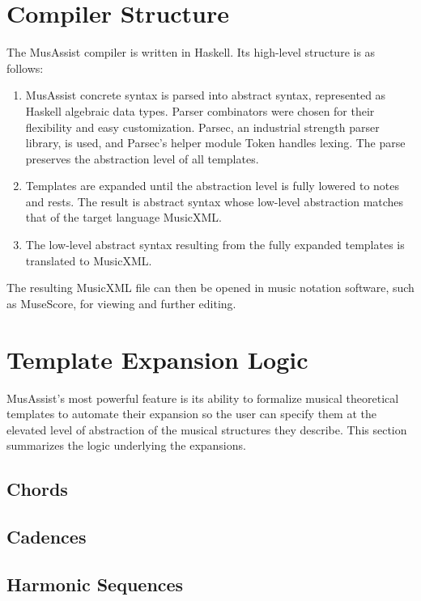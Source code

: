\documentclass{article}
\begin{document}
\section{Compiler Structure}

The MusAssist compiler is written in Haskell. Its high-level structure is as follows: 

\begin{enumerate}
  \item MusAssist concrete syntax is parsed into abstract syntax, represented as 
  Haskell algebraic data types. Parser combinators were chosen for their flexibility
  and easy customization. Parsec, an industrial strength parser library, is used, and 
  Parsec’s helper module Token handles lexing. The parse preserves the abstraction 
  level of all templates.

  \item Templates are expanded until the abstraction level is fully lowered to notes and
  rests. The result is abstract syntax whose low-level abstraction
  matches that of the target language MusicXML. 

  \item The low-level abstract syntax resulting from the fully expanded templates is 
  translated to MusicXML.
\end{enumerate}

The resulting MusicXML file can then be opened in music notation software, such as MuseScore,
for viewing and further editing. 

\section{Template Expansion Logic}
MusAssist's most powerful feature is its ability to formalize musical theoretical templates 
to automate their expansion so the user can specify them at the elevated level of abstraction 
of the musical structures they describe. This section summarizes the logic underlying the expansions.

\subsection{Chords}
\subsection{Cadences}
\subsection{Harmonic Sequences}
\end{document}
